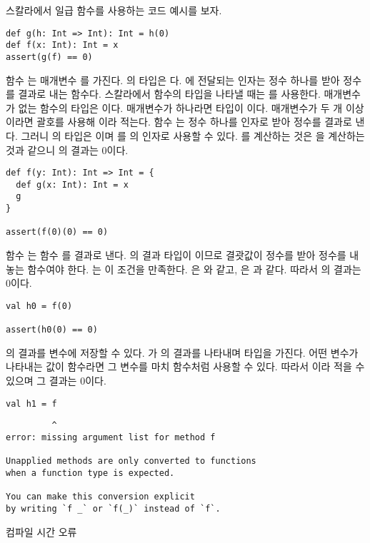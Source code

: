 스칼라에서 일급 함수를 사용하는 코드 예시를 보자.

\begin{verbatim}
def g(h: Int => Int): Int = h(0)
def f(x: Int): Int = x
assert(g(f) == 0)
\end{verbatim}

함수 는 매개변수 를 가진다. 의 타입은 다. 에 전달되는 인자는 정수 하나를 받아 정수를 결과로 내는 함수다.
스칼라에서 함수의 타입을 나타낼 때는 \code{=>}를 사용한다. 매개변수가 없는
함수의 타입은 이다. 매개변수가 하나라면 타입이
이다. 매개변수가 두 개 이상이라면 괄호를
사용해 이라 적는다. 함수
는 정수 하나를 인자로 받아 정수를 결과로 낸다. 그러니 의 타입은
이며 를 의 인자로 사용할 수 있다. 를
계산하는 것은 을 계산하는 것과 같으니 의 결과는 0이다.

\begin{verbatim}
def f(y: Int): Int => Int = {
  def g(x: Int): Int = x
  g
}

assert(f(0)(0) == 0)
\end{verbatim}

함수 는 함수 를 결과로 낸다. 의 결과 타입이 이므로 결괏값이 정수를 받아 정수를 내놓는 함수여야 한다. 는 이
조건을 만족한다. 은 와 같고, 은 과
같다. 따라서 의 결과는 0이다.

\begin{verbatim}
val h0 = f(0)

assert(h0(0) == 0)
\end{verbatim}

의 결과를 변수에 저장할 수 있다. 가 의 결과를
나타내며  타입을 가진다. 어떤 변수가 나타내는 값이 함수라면 그
변수를 마치 함수처럼 사용할 수 있다. 따라서 이라 적을 수 있으며 그 결과는 0이다.

\begin{verbatim}
val h1 = f
\end{verbatim}
\vspace{-1em}
\begin{mdframed}[hidealllines=true,backgroundcolor=gray!10,innerleftmargin=3pt,innerrightmargin=3pt,leftmargin=-3pt,rightmargin=-3pt]
\begin{verbatim}
         ^
error: missing argument list for method f

Unapplied methods are only converted to functions
when a function type is expected.

You can make this conversion explicit
by writing `f _` or `f(_)` instead of `f`.
\end{verbatim}
\vspace{-2em}
\begin{flushright}
\scriptsize\textsf{컴파일 시간 오류}
\end{flushright}
\end{mdframed}


